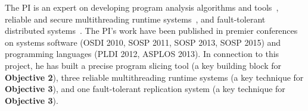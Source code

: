The PI is an expert on developing program analysis algorithms and 
tools~\cite{wu:pldi12, woodpecker:asplos13, repframe:apsys15}, reliable and 
secure multithreading runtime systems~\cite{smt:cacm, cui:tern:osdi10, 
peregrine:sosp11, parrot:sosp13}, and fault-tolerant distributed 
systems~\cite{crane:sosp15}. The PI's work have been published in 
premier conferences on systems software (OSDI 2010, SOSP 2011, SOSP 2013, SOSP 
2015) and programming languages (PLDI 2012, ASPLOS 2013). In connection to 
this project, he has built a precise program slicing tool (a key building 
block for \textbf{Objective 2}), three reliable multithreading runtime 
systems (a key technique for \textbf{Objective 3}), and one fault-tolerant 
replication system (a key technique for \textbf{Objective 3}).


% 


